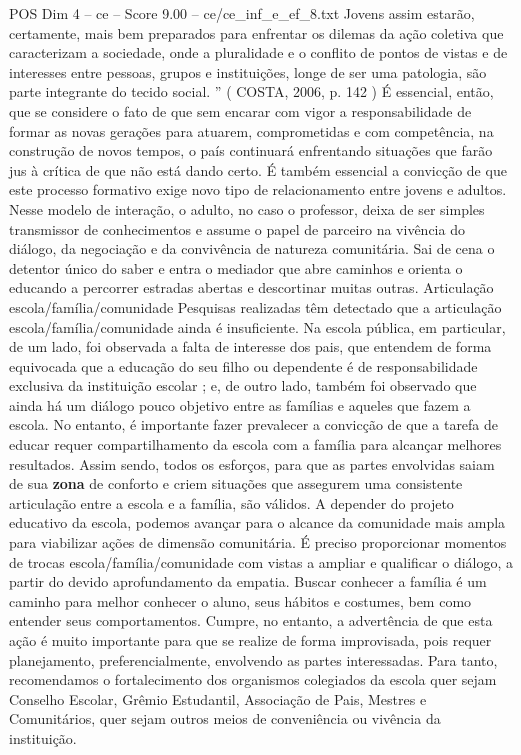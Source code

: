 \begin{textsample}{POS Dim 4 – ce – Score 9.00 – ce/ce\_inf\_e\_ef\_8.txt}
Jovens assim estarão, certamente, mais bem preparados para enfrentar os dilemas da ação coletiva que caracterizam a sociedade, onde a pluralidade e o conflito de pontos de vistas e de interesses entre pessoas, grupos e instituições, longe de ser uma patologia, são parte integrante do tecido social. ” ( COSTA, 2006, p. 142 ) É essencial, então, que se considere o fato de que sem encarar com vigor a responsabilidade de formar as novas gerações para atuarem, comprometidas e com competência, na construção de novos tempos, o país continuará enfrentando situações que farão jus à crítica de que não está dando certo.
É também essencial a convicção de que este processo formativo exige novo tipo de relacionamento entre jovens e adultos.
Nesse modelo de interação, o adulto, no caso o professor, deixa de ser simples transmissor de conhecimentos e assume o papel de parceiro na vivência do diálogo, da negociação e da convivência de natureza comunitária.
Sai de cena o detentor único do saber e entra o mediador que abre caminhos e orienta o educando a percorrer estradas abertas e descortinar muitas outras.
Articulação escola/família/comunidade Pesquisas realizadas têm detectado que a articulação escola/família/comunidade ainda é insuficiente.
Na escola pública, em particular, de um lado, foi observada a falta de interesse dos pais, que entendem de forma equivocada que a educação do seu filho ou dependente é de responsabilidade exclusiva da instituição escolar ; e, de outro lado, também foi observado que ainda há um diálogo pouco objetivo entre as famílias e aqueles que fazem a escola.
No entanto, é importante fazer prevalecer a convicção de que a tarefa de educar requer compartilhamento da escola com a família para alcançar melhores resultados.
Assim sendo, todos os esforços, para que as partes envolvidas saiam de sua \textbf{zona} de conforto e criem situações que assegurem uma consistente articulação entre a escola e a família, são válidos.
A depender do projeto educativo da escola, podemos avançar para o alcance da comunidade mais ampla para viabilizar ações de dimensão comunitária.
É preciso proporcionar momentos de trocas escola/família/comunidade com vistas a ampliar e qualificar o diálogo, a partir do devido aprofundamento da empatia.
Buscar conhecer a família é um caminho para melhor conhecer o aluno, seus hábitos e costumes, bem como entender seus comportamentos.
Cumpre, no entanto, a advertência de que esta ação é muito importante para que se realize de forma improvisada, pois requer planejamento, preferencialmente, envolvendo as partes interessadas.
Para tanto, recomendamos o fortalecimento dos organismos colegiados da escola quer sejam Conselho Escolar, Grêmio Estudantil, Associação de Pais, Mestres e Comunitários, quer sejam outros meios de conveniência ou vivência da instituição.

\end{textsample}
